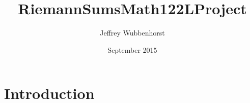 \documentclass{article}
\title{RiemannSumsMath122LProject}
\author{Jeffrey Wubbenhorst}
\date{September 2015}
\begin{document}
\maketitle

\section{Introduction}
\end{document}
